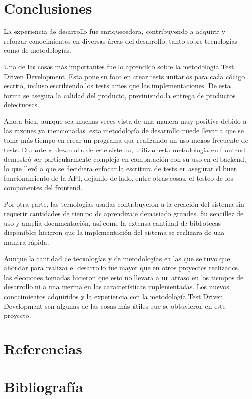 \documentclass{article}
\begin{document}
\section{Conclusiones}
La experiencia de desarrollo fue enriquecedora, contribuyendo a adquirir y reforzar conocimientos en diversas áreas del desarrollo, tanto sobre tecnologías como de metodologías.

Una de las cosas más importantes fue lo aprendido sobre la metodología Test Driven Development. Esta pone su foco en crear tests unitarios para cada código escrito, incluso escribiendo los tests antes que las implementaciones. De esta forma se asegura la calidad del producto, previniendo la entrega de productos defectuosos.

Ahora bien, aunque sea muchas veces vista de una manera muy positiva debido a las razones ya mencionadas, esta metodología de desarrollo puede llevar a que se tome más tiempo en crear un programa que realizando un uso menos frecuente de tests. Durante el desarrollo de este sistema, utilizar esta metodología en frontend demostró ser particularmente complejo en comparación con su uso en el backend, lo que llevó a que se decidiera enfocar la escritura de tests en asegurar el buen funcionamiento de la API, dejando de lado, entre otras cosas, el testeo de los componentes del frontend.

Por otra parte, las tecnologías usadas contribuyeron a la creación del sistema sin requerir cantidades de tiempo de aprendizaje demasiado grandes. Su sencillez de uso y amplia documentación, así como la extensa cantidad de bibliotecas disponibles hicieron que la implementación del sistema se realizara de una manera rápida.

Aunque la cantidad de tecnologías y de metodologías en las que se tuvo que ahondar para realizar el desarrollo fue mayor que en otros proyectos realizados, las elecciones tomadas hicieron que esto no llevara a un atraso en los tiempos de desarrollo ni a una merma en las características implementadas. Los nuevos conocimientos adquiridos y la experiencia con la metodología Test Driven Development son algunas de las cosas más útiles que se obtuvieron en este proyecto.
\newpage
\section{Referencias}
\begin{sloppypar}
\printbibliography[heading=none,category=cited]
\end{sloppypar}
\newpage
\section{Bibliografía}
\printbibliography[heading=none,notcategory=cited]
\newpage
\end{document}
